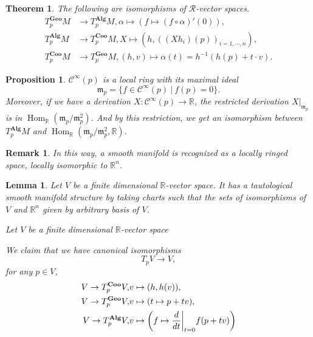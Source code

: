 \documentclass{article}
\newtheorem{theorem}{Theorem}[section]
\newtheorem{proposition}{Proposition}[section]
\newtheorem{lemma}{Lemma}[section]
\newtheorem{remark}{Remark}[section]
\numberwithin{equation}{section}
\DeclareMathOperator{\Hom}{Hom}
\begin{document}
\begin{theorem}
The following are isomorphisms of $\mathcal{R}$-vector spaces.
\begin{align*}
T^{\mathbf{Geo}}_pM&\to T^{\mathbf{Alg}}_pM, \alpha\mapsto(f\mapsto (f\circ\alpha)'(0)),\\
T^{\mathbf{Alg}}_pM&\to T^{\mathbf{Coo}}_pM, X\mapsto (h, ((Xh_i)(p))_{i=1,\cdots,n}),\\
T^{\mathbf{Coo}}_pM&\to T^{\mathbf{Geo}}_pM, (h,v)\mapsto \alpha(t)=h^{-1}(h(p)+t\cdot v).
\end{align*}
\end{theorem}

\begin{proposition}
$\mathcal{C}^\infty(p)$ is a local ring with its maximal ideal
\begin{equation*}
\mathfrak{m}_p=\{f\in\mathcal{C}^\infty(p)\:|\: f(p) = 0\}.
\end{equation*}
Moreover, if we have a derivation $X:\mathcal{C}^\infty(p)\to\mathbb{R}$, the restricted derivation $X|_{\mathfrak{m}_p}$ is in
$\Hom_{\mathbb{R}}(\mathfrak{m}_p/\mathfrak{m}_p^2)$. 
And by this restriction, we get an isomorphism between $T^{\mathbf{Alg}}_pM$ and $\Hom_{\mathbb{R}}(\mathfrak{m}_p/\mathfrak{m}_p^2,\mathbb{R})$.
\end{proposition} 

\begin{remark}
In this way, a smooth manifold is recognized as a locally ringed space, locally isomorphic to $\mathbb{R}^n$.
\end{remark}

\begin{lemma}
Let $V$ be a finite dimensional $\mathbb{R}$-vector space. It has a tautological smooth manifold structure by taking charts such 
that the sets of isomorphisms of $V$ and $\mathbb{R}^n$ given by arbitrary basis of $V$.\\
\par Let $V$ be a finite dimensional $\mathbb{R}$-vector space
\par We claim that we have canonical isomorphisms
\begin{equation*}
T_pV\to V,
\end{equation*}
for any $p\in V$,
\begin{align*}
V\to T_p^{\mathbf{Coo}}V,& v\mapsto(h,h(v)),\\
V\to T_p^{\mathbf{Geo}}V,& v\mapsto(t\mapsto p+tv),\\
V\to T_p^{\mathbf{Alg}}V,& v\mapsto\left(f\mapsto{\frac d {dt}}\bigg{|}_{t=0}f(p+tv)\right)
\end{align*}
\end{lemma}
\end{document}
